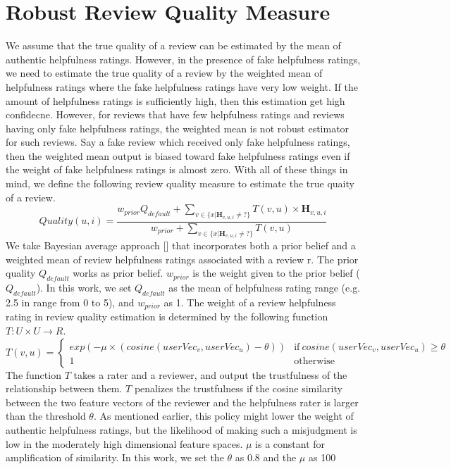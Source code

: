 \documentclass[master,english,final]{kaist-ucs}
\begin{document}
\section{Robust Review Quality Measure}

We assume that the true quality of a review can be estimated by the mean of authentic helpfulness ratings.
However, in the presence of fake helpfulness ratings, we need to estimate the true quality of a review by the weighted mean of helpfulness ratings where the fake helpfulness ratings have very low weight.
If the amount of helpfulness ratings is sufficiently high, then this estimation get high confidecne.
However, for reviews that have few helpfulness ratings and reviews having only fake helpfulness ratings, the weighted mean is not robust estimator for such reviews.
Say a fake review which received only fake helpfulness ratings, then the weighted mean output is biased toward fake helpfulness ratings even if the weight of fake helpfulness ratings is almost zero.
With all of these things in mind, we define the following review quality measure to estimate the true quaity of a review.
\begin{equation}
Quality(u,i) = \frac{ w_{prior} Q_{default} + \sum_{v \in \{x|\bm{H}_{v,u,i} \neq ?\}} T(v,u) \times \bm{H}_{v,u,i} } {w_{prior}  + \sum_{v \in \{x|\bm{H}_{v,u,i} \neq ?\}} T(v,u) }
\end{equation}
We take Bayesian average approach [] that incorporates both a prior belief and a weighted mean of review helpfulness ratings associated with a review r.
The prior quality $Q_{default}$ works as prior belief. $w_{prior}$ is the weight given to the prior belief ($Q_{default}$).
In this work, we set $Q_{default}$ as the mean of helpfulness rating range (e.g. 2.5 in range from 0 to 5), and $w_{prior}$ as 1.
The weight of a review helpfulness rating in review quality estimation is determined by the following function $T: U \times U \rightarrow R$.
\begin{equation}
T(v,u)=
\begin{cases}
  exp(-\mu \times(cosine(userVec_v,userVec_u)-\theta)) & \text{if}\ cosine(userVec_v,userVec_u) \geq \theta \\
  1 & \text{otherwise}
\end{cases}
\end{equation}
The function $T$ takes a rater and a reviewer, and output the trustfulness of the relationship between them.
$T$ penalizes the trustfulness if the cosine similarity between the two feature vectors of the reviewer and the helpfulness rater is larger than the threshold $\theta$.
As mentioned earlier, this policy might lower the weight of authentic helpfulness ratings, but the likelihood of making such a misjudgment is low in the moderately high dimensional feature spaces.
$\mu$ is a constant for amplification of similarity.
In this work, we set the $\theta$ as 0.8 and the $\mu$ as 100
\end{document}
